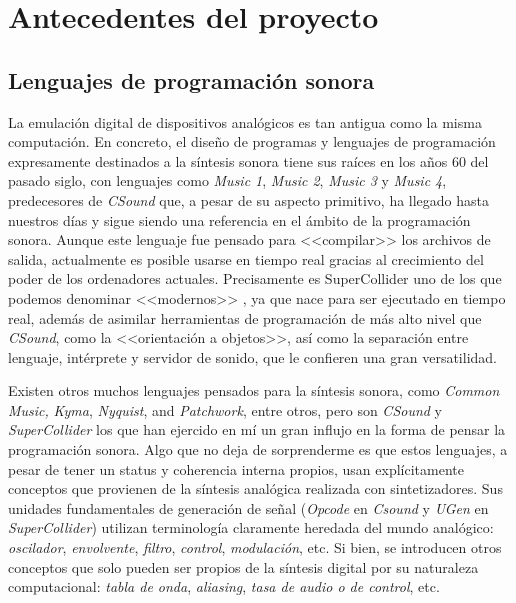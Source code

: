 \chapter[Antecedentes del proyecto]{Antecedentes del proyecto}

\section{Lenguajes de programación sonora}

La emulación digital de dispositivos analógicos es tan antigua como la misma computación. En concreto, el diseño de programas y lenguajes de programación expresamente destinados a la síntesis sonora tiene sus raíces  en los años 60 del pasado siglo, con lenguajes como \textit{Music 1}, \textit{Music 2}, \textit{Music 3} y \textit{Music 4}, predecesores de \textit{CSound} \cite[~p. xxvii]{Csound_book} que, a pesar de su aspecto primitivo, ha llegado hasta nuestros días y sigue siendo una referencia en el ámbito de la programación sonora. Aunque este lenguaje fue pensado para <<compilar>> los archivos de salida, actualmente es posible usarse en tiempo real gracias al crecimiento del poder de los ordenadores actuales. Precisamente es SuperCollider uno de los que podemos denominar <<modernos>> \cite[~p. ix]{SC_book}, ya que nace para ser ejecutado en tiempo real, además de asimilar herramientas de programación de más alto nivel que \textit{CSound}, como la <<orientación a objetos>>, así como la separación entre lenguaje, intérprete y servidor de sonido, que le confieren una gran versatilidad. 




Existen otros muchos lenguajes pensados para la síntesis sonora, como \textit{Common Music,} \textit{Kyma}, \textit{Nyquist}, and \textit{Patchwork}, entre otros, pero son \textit{CSound} y \textit{SuperCollider} los que han ejercido en mí un gran influjo en la forma de pensar la programación sonora. Algo que no deja de sorprenderme es que estos lenguajes, a pesar de tener un status y coherencia interna propios, usan explícitamente conceptos que provienen de la síntesis analógica realizada con sintetizadores. Sus unidades fundamentales de generación de señal (\textit{Opcode} en \textit{Csound} y \textit{UGen} en \textit{SuperCollider}) utilizan terminología claramente heredada del mundo analógico: \textit{oscilador}, \textit{envolvente}, \textit{filtro}, \textit{control}, \textit{modulación}, etc. Si bien, se introducen otros conceptos que solo pueden ser propios de la síntesis digital por su naturaleza computacional: \textit{tabla de onda}, \textit{aliasing}, \textit{tasa de audio o de control}, etc.

